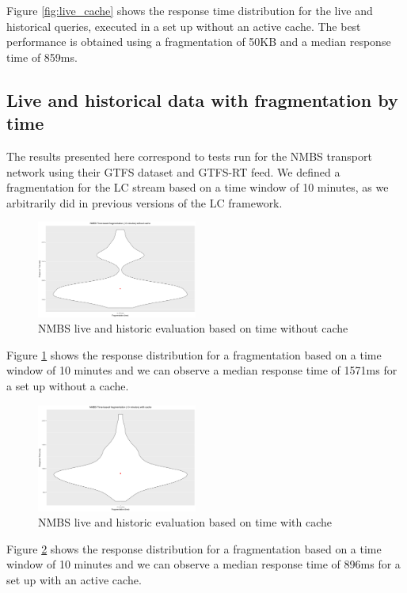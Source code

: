 \documentclass[sw]{iosart2x}
\begin{document}
	Figure \ref{fig:live_cache} shows the response time distribution for the live and historical queries, executed in a set up without an active cache. The best performance is obtained using a fragmentation of 50KB and a median response time of 859ms.
	
	\subsection{Live and historical data with fragmentation by time}
	The results presented here correspond to tests run for the NMBS transport network using their GTFS dataset and GTFS-RT feed. We defined a fragmentation for the LC stream based on a time window of 10 minutes, as we arbitrarily did in previous versions of the LC framework.
	
	\begin{figure}[h]
		\includegraphics[width=0.47\textwidth]{nmbs/time_no_cache.png}
		\caption{NMBS live and historic evaluation based on time without cache}\label{fig:time_no_cache}
	\end{figure}
	
	Figure \ref{fig:time_no_cache} shows the response distribution for a fragmentation based on a time window of 10 minutes and we can observe a median response time of 1571ms for a set up without a cache.
	
	\begin{figure}[h]
		\includegraphics[width=0.47\textwidth]{nmbs/time_cache.png}
		\caption{NMBS live and historic evaluation based on time with cache}\label{fig:time_cache}
	\end{figure}
	
	Figure \ref{fig:time_cache} shows the response distribution for a fragmentation based on a time window of 10 minutes and we can observe a median response time of 896ms for a set up with an active cache.
	
\end{document}

